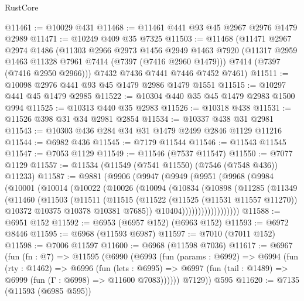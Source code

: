 \begin{lexlean}{RustCore}
\begin{coremodule}
@11461 := @10029 @431
@11468 := @11461 @441 @93 @45 @2967 @2976 @1479 @2989
@11471 := @10249 @409 @35 @7325
@11503 := @11468
    (@11471
      @2967
      @2974
      @1486
      (@11303
        @2966
        @2973
        @1456
        @2949
        @1463
        @7920
        (@11317 @2959 @1463 @11328 @7961 @7414 (@7397 (@7416 @2960 @1479)))
        @7414
        (@7397 (@7416 @2950 @2966)))
      @7432
      @7436
      @7441
      @7446
      @7452
      @7461)
@11511 := @10098 @2976 @441 @93 @45 @1479 @2986 @1479 @1551
@11515 := @10297 @441 @45 @1479 @2985
@11522 := @10304 @440 @35 @45 @1479 @2983 @1500 @994
@11525 := @10313 @440 @35 @2983
@11526 := @10318 @438
@11531 := @11526 @398 @31 @34 @2981 @2854
@11534 := @10337 @438 @31 @2981
@11543 := @10303 @436 @284 @34 @31 @1479 @2499 @2846 @1129 @11216
@11544 := @6982 @436
@11545 := @7179 @11544
@11546 := @11543 @11545
@11547 := @7053 @1129
@11549 := @11546 (@7537 @11547)
@11550 := @7077 @1129
@11557 := @11534 (@11549 (@7541 @11550) (@7546 (@7548 @436)) @11233)
@11587 := @9881
    (@9906
      (@9947
        (@9949
          (@9951
            (@9968
              (@9984
                (@10001
                  (@10014
                    (@10022
                      (@10026
                        (@10094
                          (@10834
                            (@10898
                              (@11285
                                (@11349
                                  (@11460
                                    (@11503
                                      (@11511
                                        (@11515
                                          (@11522
                                            (@11525 (@11531 @11557 @11270))
                                            @10372
                                            @10375
                                            @10378
                                            @10381
                                            @7685))
                                        @10404))))))))))))))))))
@11588 := @6951 @152
@11592 := @6953 (@6957 @152) (@6963 @152)
@11593 := @6972 @8446
@11595 := @6968 (@11593 @6987)
@11597 := @7010 (@7011 @152)
@11598 := @7006 @11597
@11600 := @6968 (@11598 @7036)
@11617 := @6967
    (fun (fn : @7) =>
    @11595
      (@6990
        (@6993
          (fun (params : @6992) =>
          @6994
            (fun (rty : @1462) =>
            @6996
              (fun (lets : @6995) =>
              @6997 (fun (tail : @1489) => @6999 (fun (Γ : @6998) => @11600 @7083))))))
        @7129))
    @595
@11620 := @7135 (@11593 (@6985 @595))

\end{coremodule}
\end{lexlean}
